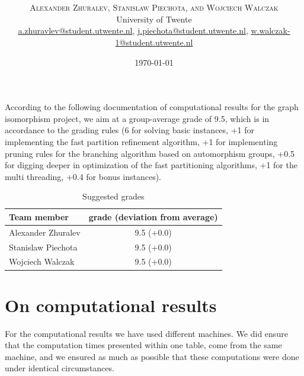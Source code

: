 \documentclass[twoside]{article}
\title{\vspace{-15mm}\fontsize{24pt}{10pt}\selectfont\textbf{\articletitle}} %
\author{
\large
\textsc{Alexander Zhuralev, Stanislaw Piechota, and Wojciech Walczak}\\[2mm] %
\normalsize University of Twente \\ %
\normalsize \href{mailto:a.zhuravlev@student.utwente.nl}{a.zhuravlev@student.utwente.nl},
\href{mailto:j.piechota@student.utwente.nl}{j.piechota@student.utwente.nl},
\href{mailto:w.walczak-1@student.utwente.nl}{w.walczak-1@student.utwente.nl}%
}
\date{\today}
\begin{document}
\thispagestyle{empty}
\maketitle %


%
%



According to the following documentation of computational results for the graph isomorphism project, we aim at a group-average grade of 9.5, which is in accordance to the grading rules (6 for solving basic instances, +1 for implementing the fast partition refinement algorithm, +1 for implementing pruning rules for the branching algorithm based on automorphism groups, +0.5 for digging deeper in optimization of the fast partitioning algorithms, +1 for the multi threading, +0.4 for bonus instances).
\begin{table}[h]
	\centering
	\begin{tabular}{l|c}
		Team member &grade (deviation from average)\\
		\hline
		Alexander Zhuralev & 9.5 (+0.0)\\
		Stanislaw Piechota & 9.5 (+0.0)\\
		Wojciech Walczak & 9.5 (+0.0)
	\end{tabular}
	\caption{Suggested grades}
\end{table}

\section*{On computational results}
For the computational results we have used different machines.
We did ensure that the computation times presented within one table, come from the same machine, and we ensured as much as possible that these computations were done under identical circumstances.
\end{document}
